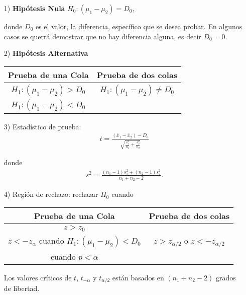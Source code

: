 \documentclass[a4paper]{report} %
\begin{document}
\begin{itemize}
\item[1) ] \textbf{Hip\'otesis Nula} $H_{0}:\left(\mu_{1}-\mu_{2}\right)=D_{0}$,\medskip

donde $D_{0}$ es el valor, la diferencia, espec\'ifico que se desea probar. En algunos casos se querr\'a demostrar que no hay diferencia alguna, es decir $D_{0}=0$.

\item[2) ] \textbf{Hip\'otesis Alternativa}
\begin{center}
\begin{tabular}{cc}\hline
\textbf{Prueba de una Cola} & \textbf{Prueba de dos colas}\\\hline
$H_{1}:\left(\mu_{1}-\mu_{2}\right)>D_{0}$ & $H_{1}:\left(\mu_{1}-\mu_{2}\right)\neq D_{0}$\\ 
$H_{1}:\left(\mu_{1}-\mu_{2}\right)<D_{0}$&\\
\end{tabular}
\end{center}

\item[3) ] Estad\'istico de prueba:
\begin{eqnarray}t=\frac{\left(\overline{x}_{1}-\overline{x}_{2}\right)-D_{0}}{\sqrt{\frac{s^{2}_{1}}{n_{1}}+\frac{s^{2}_{2}}{n_{2}}}}\end{eqnarray}


donde \begin{eqnarray}s^{2}=\frac{\left(n_{1}-1\right)s_{1}^{2}+\left(n_{2}-1\right)s_{2}^{2}}{n_{1}+n_{2}-2}.\end{eqnarray}

\item[4) ] Regi\'on de rechazo: rechazar $H_{0}$ cuando
\begin{center}
\begin{tabular}{cc}\hline
\textbf{Prueba de una Cola} & \textbf{Prueba de dos colas}\\\hline
$z>z_{0}$ & \\
$z<-z_{\alpha}$ cuando $H_{1}:\left(\mu_{1}-\mu_{2}\right)<D_{0}$&$z>z_{\alpha/2}$ o $z<-z_{\alpha/2}$\\
 cuando $p<\alpha$&\\
\end{tabular}
\end{center}

Los valores cr\'iticos de $t$, $t_{-\alpha}$ y $t_{\alpha/2}$ est\'an basados en $\left(n_{1}+n_{2}-2\right)$ grados de libertad.
\end{itemize}
\end{document}
